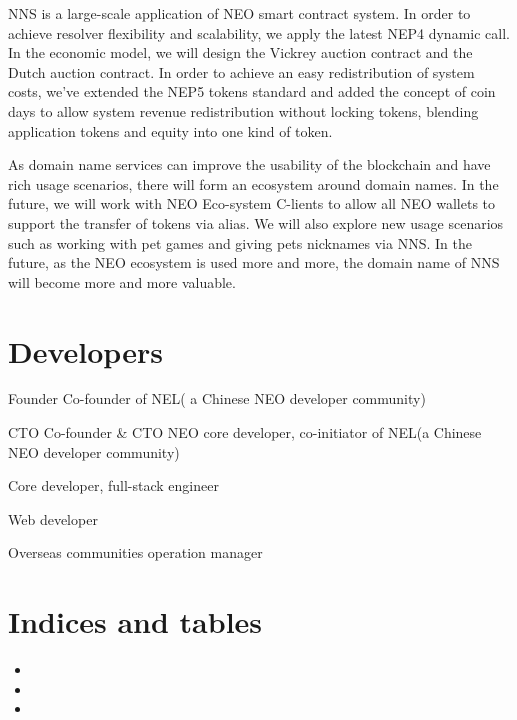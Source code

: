 \documentclass[letterpaper,10pt,english]{sphinxmanual}
\begin{document}
NNS is a large-scale application of NEO smart contract system. In order to achieve resolver flexibility and scalability, we apply the latest NEP4 dynamic call.
In the economic model, we will design the Vickrey auction contract and the Dutch auction contract. In order to achieve an easy redistribution of system costs,
we’ve extended the NEP5 tokens standard and added the concept of coin days to allow system revenue redistribution without locking tokens,
blending application tokens and equity into one kind of token.

As domain name services can improve the usability of the blockchain and have rich usage scenarios, there will form an ecosystem around domain names.
In the future, we will work with NEO Eco-system C-lients to allow all NEO wallets to support the transfer of tokens via alias.
We will also explore new usage scenarios such as working with pet games and giving pets nicknames via NNS.
In the future, as the NEO ecosystem is used more and more, the domain name of NNS will become more and more valuable.


\chapter{Developers}
\label{\detokenize{nns_developer::doc}}\label{\detokenize{nns_developer:developers}}

Founder
Co-founder of NEL( a Chinese NEO developer community)


CTO Co-founder \& CTO
NEO core developer, co-initiator of NEL(a Chinese NEO developer community)


Core developer, full-stack engineer


Web developer


Overseas communities operation manager


\chapter{Indices and tables}
\label{\detokenize{index:indices-and-tables}}\begin{itemize}
\item {} 

\item {} 

\item {} 

\end{itemize}



\renewcommand{\indexname}{Index}
\printindex
\end{document}
